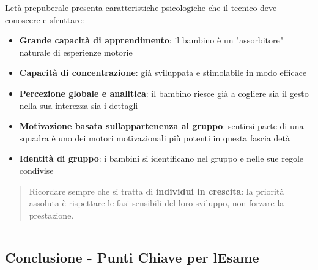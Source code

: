 \documentclass[a4paper,11pt]{article}
\providecommand{\tightlist}{%
  \setlength{\itemsep}{0pt}\setlength{\parskip}{0pt}}
\begin{document}
L\textquotesingle età prepuberale presenta caratteristiche psicologiche
che il tecnico deve conoscere e sfruttare:

\begin{itemize}
      \tightlist
      \item
            \textbf{Grande capacità di apprendimento}: il bambino è un
            "assorbitore" naturale di esperienze motorie
      \item
            \textbf{Capacità di concentrazione}: già sviluppata e stimolabile in
            modo efficace
      \item
            \textbf{Percezione globale e analitica}: il bambino riesce già a
            cogliere sia il gesto nella sua interezza sia i dettagli
      \item
            \textbf{Motivazione basata sull\textquotesingle appartenenza al
                  gruppo}: sentirsi parte di una squadra è uno dei motori motivazionali
            più potenti in questa fascia d\textquotesingle età
      \item
            \textbf{Identità di gruppo}: i bambini si identificano nel gruppo e
            nelle sue regole condivise
\end{itemize}

\begin{quote}
      Ricordare sempre che si tratta di \textbf{individui in crescita}: la
      priorità assoluta è rispettare le fasi sensibili del loro sviluppo, non
      forzare la prestazione.
\end{quote}

\begin{center}\rule{0.5\linewidth}{0.5pt}\end{center}

\subsection{Conclusione - Punti Chiave per
      l\textquotesingle Esame}\label{conclusione---punti-chiave-per-lesame-13}
\end{document}
